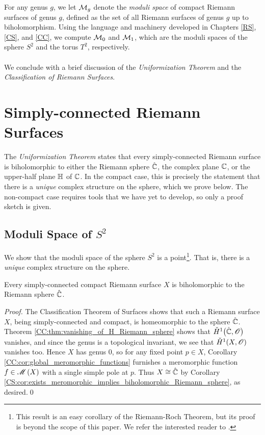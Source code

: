 \documentclass[../Moduli_Spaces_of_Riemann_Surfaces.tex]{subfiles}
\begin{document}
    For any genus $g$, we let $\mathcal{M}_g$ denote the \textit{moduli space} of compact Riemann surfaces of genus $g$, defined as the set of all Riemann surfaces of genus $g$ up to biholomorphism. Using the language and machinery developed in Chapters \ref{RS}, \ref{CS}, and \ref{CC}, we compute $\mathcal{M}_0$ and $\mathcal{M}_1$, which are the moduli spaces of the sphere $S^2$ and the torus $T^2$, respectively.\\\ \\
    We conclude with a brief discussion of the \textit{Uniformization Theorem} and the \textit{Classification of Riemann Surfaces}.
    \section{Simply-connected Riemann Surfaces}
    The \textit{Uniformization Theorem} states that every simply-connected Riemann surface is biholomorphic to either the Riemann sphere $\hat{\mathbb{C}}$, the complex plane $\mathbb{C}$, or the upper-half plane $\mathbb{H}$ of $\mathbb{C}$. In the compact case, this is precisely the statement that there is a \textit{unique} complex structure on the sphere, which we prove below. The non-compact case requires tools that we have yet to develop, so only a proof sketch is given.
    \subsection{Moduli Space of $S^2$}\label{MS:sec:moduli_space_of_sphere}
    We show that the moduli space of the sphere $S^2$ is a point\footnote{This result is an easy corollary of the Riemann-Roch Theorem, but its proof is beyond the scope of this paper. We refer the interested reader to \cite[][Section 16]{forster}.}. That is, there is a \textit{unique} complex structure on the sphere.
    \begin{theorem}\label{MS:thm:simply-connect_compact_biholomorphic_Riemann_sphere}
        Every simply-connected compact Riemann surface $X$ is biholomorphic to the Riemann sphere $\hat{\mathbb{C}}$.
    \end{theorem}
    \begin{proof}
        The Classification Theorem of Surfaces shows that such a Riemann surface $X$, being simply-connected and compact, is homeomorphic to the sphere $\hat{\mathbb{C}}$. Theorem \ref{CC:thm:vanishing_of_H_Riemann_sphere} shows that $\check{H}^1\big(\hat{\mathbb{C}},\mathscr{O}\big)$ vanishes, and since the genus is a topological invariant, we see that $\check{H}^1\!\left(X,\mathscr{O}\right)$ vanishes too. Hence $X$ has genus $0$, so for any fixed point $p\in X$, Corollary \ref{CC:cor:global_meromorphic_functions} furnishes a meromorphic function $f\in\mathscr{M}\left(X\right)$ with a single simple pole at $p$. Thus $X\cong\hat{\mathbb{C}}$ by Corollary \ref{CS:cor:exists_meromorphic_implies_biholomorphic_Riemann_sphere}, as desired.\qed
    \end{proof}
\end{document}
